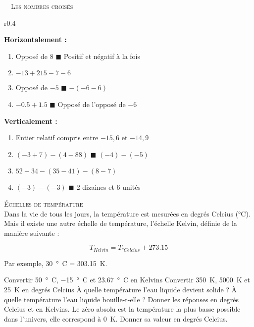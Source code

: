 \documentclass[../Cours.tex]{subfiles}
\begin{document}
\begin{questions}
    \exercice ~~\textsc{Les nombres croisés}\\
    \begin{wrapfigure}{r}{0.4\linewidth}
    \end{wrapfigure}
    \textbf{Horizontalement :}
    \begin{enumerate}
        \item Opposé de 8 $\blacksquare$ Positif et négatif à la fois
        \item $-13+215-7-6$
        \item Opposé de $-5$ $\blacksquare$ $-(-6-6)$
        \item $-0.5+1.5$ $\blacksquare$ Opposé de l'opposé de $-6$
    \end{enumerate}
    \textbf{Verticalement :}
    \begin{enumerate}
        \item Entier relatif compris entre $-15,6$ et $-14,9$
        \item $(-3+7) - (4-88)$ $\blacksquare$ $(-4) - (-5)$
        \item $52+34 - (35-41) - (8-7)$
        \item $(-3) - (-3)$ $\blacksquare$ 2 dizaines et 6 unités
    \end{enumerate}
    
    \exercice \textsc{Échelles de température}\\
    
    Dans la vie de tous les jours, la température est mesurées en degrés Celcius (°C). Mais il existe une autre échelle de température, l'échelle Kelvin, définie de la manière suivante :
    
    \[ T_{Kelvin} = T_{°Celcius} + \num{273,15} \]
    
    Par exemple, \qty{30}{°C} = \qty{303.15}{K}.
    
        \question Convertir \qty{50}{°C}, \qty{-15}{°C} et \qty{23,67}{°C} en Kelvins
        \question Convertir \qty{350}{K}, \qty{5000}{K} et \qty{25}{K} en degrés Celcius
        \question À quelle température l'eau liquide devient solide ? À quelle température l'eau liquide bouille-t-elle ? Donner les réponses en degrés Celcius et en Kelvins.
        \question Le zéro absolu est la température la plus basse possible dans l'univers, elle correspond à \qty{0}{K}. Donner sa valeur en degrés Celcius.
        

\end{questions}
\end{document}
